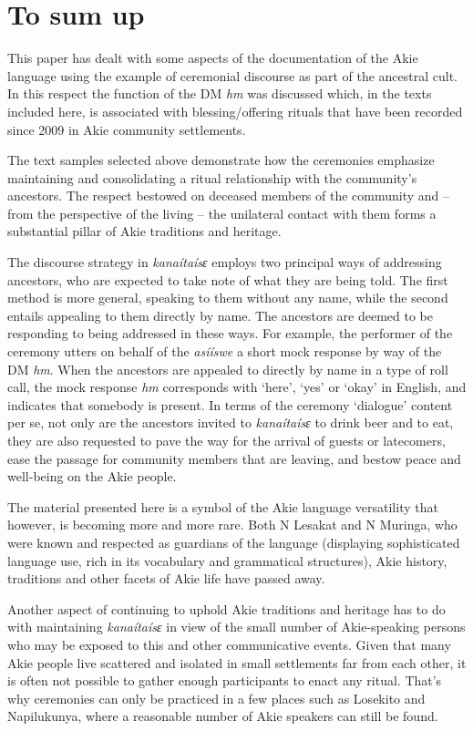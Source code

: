 \documentclass[output=paper,colorlinks,citecolor=brown]{langscibook}
\begin{document}
\section{To sum up}\label{sec:legere:5}

This paper has dealt with some aspects of the documentation of the Akie language using the example of ceremonial discourse as part of the ancestral cult.  In this respect the function of the DM \textit{hm} was discussed which, in the texts included here, is associated with blessing/offering rituals that have been recorded since 2009 in Akie community settlements. 

The text samples selected above demonstrate how the ceremonies emphasize maintaining and consolidating a ritual relationship with the community’s ancestors. The respect bestowed on deceased members of the community and – from the perspective of the living – the unilateral contact with them forms a substantial pillar of Akie traditions and heritage.

The discourse strategy in \textit{kanaítaísɛ} employs two principal ways of addressing ancestors, who are expected to take note of what they are being told. The first method is more general, speaking to them without any name, while the second entails appealing to them directly by name. The ancestors are deemed to be responding to being addressed in these ways. For example, the performer of the ceremony utters on behalf of the \textit{asííswe} a short mock response by way of the DM \textit{hm}. When the ancestors are appealed to directly by name in a type of roll call, the mock response \textit{hm} corresponds with ‘here’, ‘yes’ or ‘okay’ in English, and indicates that somebody is present. In terms of the ceremony ‘dialogue’ content per se, not only are the ancestors invited to \textit{kanaítaísɛ} to drink beer and to eat, they are also requested to pave the way for the arrival of guests or latecomers, ease the passage for community members that are leaving, and bestow peace and well-being on the Akie people.

The material presented here is a symbol of the Akie language versatility that however, is becoming more and more rare. Both N Lesakat and N Muringa, who were known and respected as guardians of the language (displaying sophisticated language use, rich in its vocabulary and grammatical structures), Akie history, traditions and other facets of Akie life  have passed away. 

Another aspect of continuing to uphold Akie traditions and heritage has to do with maintaining \textit{kanaítaísɛ} in view of the small number of Akie-speaking persons who may be exposed to this and other communicative events. Given that many Akie people live scattered and isolated in small settlements far from each other, it is often not possible to gather enough participants to enact any ritual. That’s why ceremonies can only be practiced in a few places such as Losekito and Napilukunya, where a reasonable number of Akie speakers can still be found.
\end{document}
